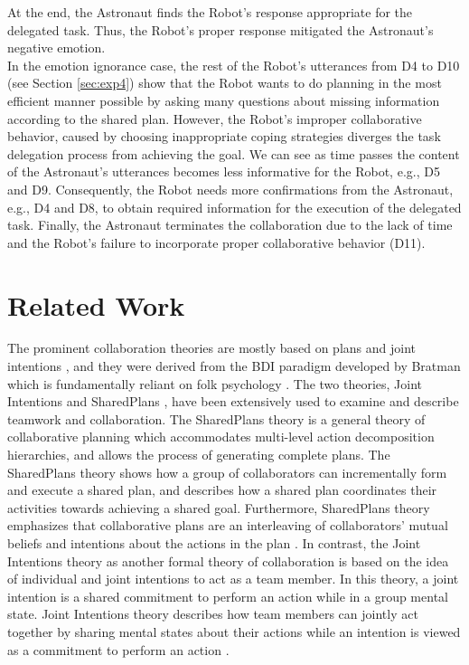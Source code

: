 At the end, the Astronaut finds the Robot's response appropriate for the
delegated task. Thus, the Robot's proper response mitigated the Astronaut's
negative emotion.\\

In the emotion ignorance case, the rest of the Robot's utterances from D4 to
D10 (see Section \ref{sec:exp4}) show that the Robot wants to do planning in
the most efficient manner possible by asking many questions about missing
information according to the shared plan. However, the Robot's improper
collaborative behavior, caused by choosing inappropriate coping strategies
diverges the task delegation process from achieving the goal. We can see
as time passes the content of the Astronaut's utterances becomes less
informative for the Robot, e.g., D5 and D9. Consequently, the Robot needs more
confirmations from the Astronaut, e.g., D4 and D8, to obtain required
information for the execution of the delegated task. Finally, the Astronaut
terminates the collaboration due to the lack of time and the Robot's failure to
incorporate proper collaborative behavior (D11).

\section{Related Work}
\label{sec:related-work}

The prominent collaboration theories are mostly based on plans and joint
intentions
\cite{cohen:teamwork,grosz:plans-discourse}, and they were derived from
the BDI paradigm developed by Bratman \cite{bratman:intentions-plans} which is
fundamentally reliant on folk psychology \cite{ravenscroft:folk}. The two
theories, Joint Intentions \cite{cohen:teamwork} and SharedPlans
\cite{grosz:plans-discourse}, have been extensively used to examine and describe
teamwork and collaboration. The SharedPlans theory is a general theory of
collaborative planning which accommodates multi-level action decomposition
hierarchies, and allows the process of generating complete plans. The
SharedPlans theory shows how a group of collaborators can incrementally form and
execute a shared plan, and describes how a shared plan coordinates their
activities towards achieving a shared goal. Furthermore, SharedPlans theory
emphasizes that collaborative plans are an interleaving of collaborators' mutual
beliefs and intentions about the actions in the plan
\cite{grosz:planning-acting,grosz:collaboration,grosz:plans-discourse}. In
contrast, the Joint Intentions theory as another formal theory of collaboration
is based on the idea of individual and joint intentions to act as a team member.
In this theory, a joint intention is a shared commitment to perform an action
while in a group mental state. Joint Intentions theory describes how team
members can jointly act together by sharing mental states about their actions
while an intention is viewed as a commitment to perform an action
\cite{cohen:teamwork}.

